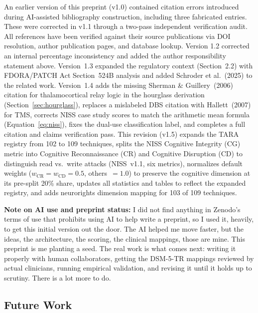 An earlier version of this preprint (v1.0) contained citation errors
introduced during AI-assisted bibliography construction, including three
fabricated entries. These were corrected in v1.1 through a two-pass
independent verification audit. All references have been verified against
their source publications via DOI resolution, author publication pages,
and database lookup. Version 1.2 corrected an internal percentage
inconsistency and added the author responsibility statement above.
Version~1.3 expanded the regulatory context (Section~2.2) with
FDORA/PATCH Act Section~524B analysis and added Schroder et al.~(2025)
to the related work. Version~1.4 adds the missing Sherman \&
Guillery~(2006) citation for thalamocortical relay logic in the hourglass
derivation (Section~\ref{sec:hourglass}), replaces a mislabeled DBS citation
with Hallett~(2007) for TMS, corrects NISS case study scores to match the
arithmetic mean formula (Equation~\ref{eq:niss}), fixes the dual-use
classification label, and completes a full citation and claims verification
pass. This revision (v1.5) expands the TARA registry from 102 to 109
techniques, splits the NISS Cognitive Integrity (CG) metric into Cognitive
Reconnaissance (CR) and Cognitive Disruption (CD) to distinguish read vs.\
write attacks (NISS~v1.1, six metrics), normalizes default weights
($w_{\text{CR}} = w_{\text{CD}} = 0.5$, others~$= 1.0$) to preserve the
cognitive dimension at its pre-split 20\% share, updates all statistics and
tables to reflect the expanded registry, and adds neurorights dimension
mapping for 103 of 109 techniques.

\noindent\textbf{Note on AI use and preprint status:} I did not find anything
in Zenodo's terms of use that prohibits using AI to help write a preprint, so
I used it, heavily, to get this initial version out the door. The AI helped
me move faster, but the ideas, the architecture, the scoring, the clinical
mappings, those are mine. This preprint is me planting a seed. The real work
is what comes next: writing it properly with human collaborators, getting the
DSM-5-TR mappings reviewed by actual clinicians, running empirical validation,
and revising it until it holds up to scrutiny. There is a lot more to do.

\subsection{Future Work}

